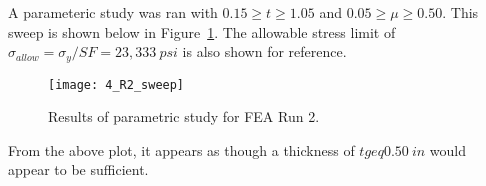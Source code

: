 A parameteric study was ran with $0.15 \geq t \geq 1.05$ and $0.05 \geq \mu \geq 0.50$. This sweep is shown below in Figure~\ref{fig:4_R2_sweep}. The allowable stress limit of $\sigma_{allow}=\sigma_{y}/SF = 23,333\ psi$ is also shown for reference.

\begin{figure}[H]
	\centering
	\texttt{[image: 4\_R2\_sweep]}
	\caption{Results of parametric study for FEA Run 2.}
	\label{fig:4_R2_sweep}
\end{figure}

From the above plot, it appears as though a thickness of $t geq 0.50\ in$ would appear to be sufficient.


